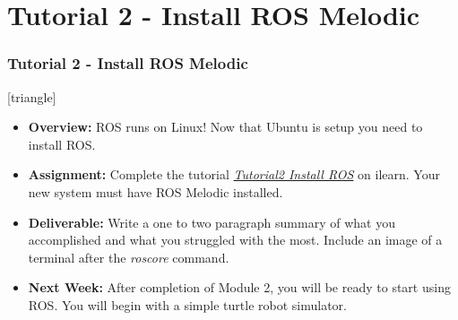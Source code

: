 \documentclass[fleqn]{beamer} %
\newcommand{\sectiontitleV}{Tutorial 2 - Install ROS Melodic}
\begin{document}
\section{\sectiontitleV}	
	            \begin{frame}[label=sectionV] \small
		\frametitle{\sectiontitleV}    
	
 [triangle]
                \begin{itemize}

					\item {\bf Overview:} ROS runs on Linux! Now that Ubuntu is setup you need to install ROS. 		

					\item {\bf Assignment:} Complete the tutorial \href{https://github.com/thillRobot/ros_workshop/blob/main/module2/tutorial2_install_ros/tutorial2_install_ros.md}{\it Tutorial2 Install ROS} on ilearn. Your new system must have ROS Melodic installed.
                    
                    \item {\bf Deliverable:} Write a one to two paragraph summary of what you accomplished and what you struggled with the most. Include an image of a terminal after the {\it roscore} command. 
    
                    \item {\bf Next Week:} After completion of Module 2, you will be ready to start using ROS. You will begin with a simple turtle robot simulator. \vspc
                               
                \end{itemize}
		\end{frame}
\end{document}
